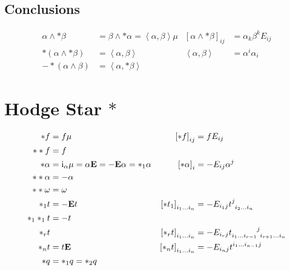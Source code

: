 \documentclass[a4paper,10pt]{scrartcl}
\newcommand{\iup}{\mathrm{i}}
\newcommand{\Eb}{\mathbf{E}}
\begin{document}
\subsection{Conclusions}
  \begin{align*}
    \alpha \wedge *\beta &= \beta \wedge *\alpha = \left\langle \alpha,\beta \right\rangle\mu
            & \left[  \alpha \wedge *\beta \right]_{ij} &= \alpha_{k}\beta^{k}E_{ij} \\
    *\left( \alpha \wedge *\beta \right) &= \left\langle \alpha, \beta \right\rangle
                            & \left\langle \alpha, \beta \right\rangle &= \alpha^{i}\alpha_{i} \\
    -*\left( \alpha \wedge \beta \right) &= \left\langle \alpha, *\beta \right\rangle
  \end{align*}

\section{Hodge Star \( *\)}
\begin{align*}
  *f &= f\mu 
            &\left[ *f \right]_{ij} &= fE_{ij} \\
  **f &= f\\
  *\alpha &= \iup_{\alpha}\mu = \alpha\Eb = -\Eb\alpha = *_{1}\alpha
              &\left[ *\alpha \right]_{i} &= -E_{ij}\alpha^{j}\\
  **\alpha &= -\alpha \\
  **\omega &= \omega \\
  *_{1}t &= -\Eb t
          & \left[ *t_{1} \right]_{i_{1}\ldots i_{n}} &= -E_{i_{1}j}\tensor{t}{^{j}_{i_{2}\ldots i_{n}}} \\
  *_{1}*_{1}t &= -t\\
  *_{r}t && \left[ *_{r}t \right]_{i_{1}\ldots i_{n}} &= -E_{i_{r}j}\tensor{t}{_{i_{1}\ldots i_{r-1}}^{j}_{i_{r+1}\ldots i_{n}}} \\
  *_{n}t &= t\Eb
          & \left[ *_{n}t \right]_{i_{1}\ldots i_{n}} &= -E_{i_{n}j}\tensor{t}{^{i_{1}\ldots i_{n-1}}^{j}} \\
  *q &= *_{1} q = *_{2} q
\end{align*}
\end{document}
